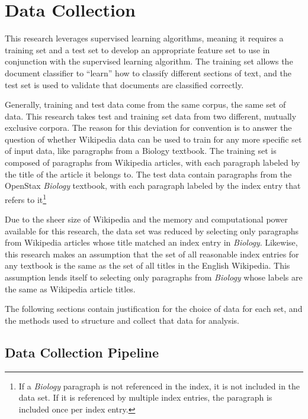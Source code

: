 \section{Data Collection}
\label{sec:data-collection}

This research leverages supervised learning algorithms, meaning it requires a training set and a test set to develop an appropriate feature set to use in conjunction with the supervised learning algorithm.
The training set allows the document classifier to ``learn'' how to classify different sections of text, and the test set is used to validate that documents are classified correctly.

Generally, training and test data come from the same corpus, the same set of data\cite{jurafsky}.
This research takes test and training set data from two different, mutually exclusive corpora.
The reason for this deviation for convention is to answer the question of whether Wikipedia data can be used to train for any more specific set of input data, like paragraphs from a Biology textbook.
The training set is composed of paragraphs from Wikipedia articles, with each paragraph labeled by the title of the article it belongs to.
The test data contain paragraphs from the OpenStax {\it Biology} textbook\cite{biology}, with each paragraph labeled by the index entry that refers to it\footnote{If a {\it Biology} paragraph is not referenced in the index, it is not included in the data set. If it is referenced by multiple index entries, the paragraph is included once per index entry.}

Due to the sheer size of Wikipedia and the memory and computational power available for this research, the data set was reduced by selecting only paragraphs from Wikipedia articles whose title matched an index entry in {\it Biology}.
Likewise, this research makes an assumption that the set of all reasonable index entries for any textbook is the same as the set of all titles in the English Wikipedia.
This assumption lends itself to selecting only paragraphs from {\it Biology} whose labels are the same as Wikipedia article titles.

The following sections contain justification for the choice of data for each set, and the methods used to structure and collect that data for analysis.

\subsection{Data Collection Pipeline}

